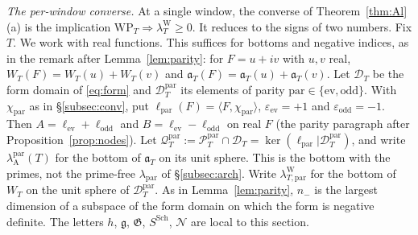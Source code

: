 \documentclass[11pt]{amsart}
\theoremstyle{definition}
\theoremstyle{remark}
\newcommand{\PT}{\mathcal P_T}
\newcommand{\lamW}{\lambda^{\mathrm W}_T}
\begin{document}
\emph{The per-window converse.} At a single window, the converse of Theorem~\ref{thm:Al}(a) is the
implication $\mathrm{WP}_T\Rightarrow\lamW\ge0$. It reduces to the signs of two numbers. Fix $T$. We work
with real functions. This suffices for bottoms and negative indices, as in the remark after
Lemma~\ref{lem:parity}: for $F=u+iv$ with $u,v$ real, $W_T(F)=W_T(u)+W_T(v)$ and
$\mathfrak a_T(F)=\mathfrak a_T(u)+\mathfrak a_T(v)$. Let $\mathcal D_T$ be the form domain of \eqref{eq:form}
and $\mathcal D^{\mathrm{par}}_T$ its elements of parity $\mathrm{par}\in\{\mathrm{ev},\mathrm{odd}\}$. With
$\chi_{\mathrm{par}}$ as in \S\ref{subsec:conv}, put
$\ell_{\mathrm{par}}(F)=\langle F,\chi_{\mathrm{par}}\rangle$, $\varepsilon_{\mathrm{ev}}=+1$ and
$\varepsilon_{\mathrm{odd}}=-1$. Then $A=\ell_{\mathrm{ev}}+\ell_{\mathrm{odd}}$ and
$B=\ell_{\mathrm{ev}}-\ell_{\mathrm{odd}}$ on real $F$ (the parity paragraph after
Proposition~\ref{prop:nodes}). Let $\mathcal Q^{\mathrm{par}}_T:=\PT^{\mathrm{par}}\cap\mathcal D_T
=\ker(\ell_{\mathrm{par}}|\mathcal D^{\mathrm{par}}_T)$, and write $\lambda^{\mathrm{par}}_{\mathrm A}(T)$ for the
bottom of $\mathfrak a_T$ on its unit sphere. This is the bottom with the primes, not the prime-free
$\lambda_{\mathrm{par}}$ of \S\ref{subsec:arch}. Write $\lambda^{\mathrm W}_{T,\mathrm{par}}$ for the bottom of
$W_T$ on the unit sphere of $\mathcal D^{\mathrm{par}}_T$. As in Lemma~\ref{lem:parity}, $n_-$ is the largest
dimension of a subspace of the form domain on which the form is negative definite. The letters $h$,
$\mathfrak g$, $\mathfrak G$, $S^{\mathrm{Sch}}$, $\mathcal N$ are local to this section.
\end{document}

